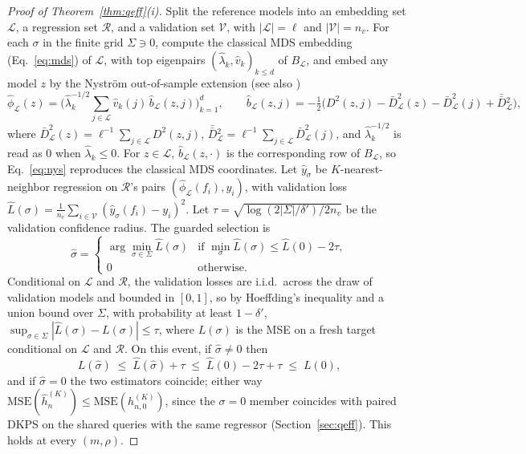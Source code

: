 \documentclass{article}
\theoremstyle{definition}
\theoremstyle{plain}
\begin{document}
\begin{proof}[Proof of Theorem~\ref{thm:qeff}(i)]
Split the reference models into an embedding set $\mathcal{L}$, a regression set $\mathcal{R}$, and a
validation set $\mathcal{V}$, with $|\mathcal{L}|=\ell$ and $|\mathcal{V}|=n_v$. For each $\sigma$ in the finite
grid $\Sigma\ni0$, compute the classical MDS embedding (Eq.~\eqref{eq:mds}) of $\mathcal{L}$,
with top eigenpairs $(\hat\lambda_k,\hat v_k)_{k\le d}$ of $B_{\mathcal{L}}$, and embed any model
$z$ by the Nystr\"om out-of-sample extension  (see also \citealp{trosset2008out})
\begin{equation}
\hat\phi_{\mathcal{L}}(z)=\Big(\hat\lambda_k^{-1/2}\sum_{j\in\mathcal{L}}\hat v_k(j)\,\hat b_{\mathcal{L}}(z,j)\Big)_{k=1}^{d},
\qquad
\hat b_{\mathcal{L}}(z,j)=-\tfrac12\Big(D^2(z,j)-\bar D^2_{\mathcal{L}}(z)-\bar D^2_{\mathcal{L}}(j)+\bar{\bar D}{}^2_{\mathcal{L}}\Big),
\label{eq:nys}
\end{equation}
where $\bar D^2_{\mathcal{L}}(z)=\ell^{-1}\sum_{j\in\mathcal{L}}D^2(z,j)$,
$\bar{\bar D}{}^2_{\mathcal{L}}=\ell^{-1}\sum_{j\in\mathcal{L}}\bar D^2_{\mathcal{L}}(j)$, and
$\hat\lambda_k^{-1/2}$ is read as $0$ when $\hat\lambda_k\le0$. For $z\in\mathcal{L}$,
$\hat b_{\mathcal{L}}(z,\cdot)$ is the corresponding row of $B_{\mathcal{L}}$, so Eq.~\eqref{eq:nys}
reproduces the classical MDS coordinates. Let $\hat y_{\sigma}$ be $K$-nearest-neighbor
regression on $\mathcal{R}$'s pairs $(\hat\phi_{\mathcal{L}}(f_i),y_i)$, with validation loss
$\hat L(\sigma)=\tfrac1{n_v}\sum_{i\in\mathcal{V}}(\hat y_{\sigma}(f_i)-y_i)^2$.
Let $\tau=\sqrt{\log(2|\Sigma|/\delta')/2n_v}$ be the validation confidence
radius. The guarded selection is
\[
\hat\sigma=\begin{cases}
\arg\min_{\sigma\in\Sigma}\hat L(\sigma) & \text{if }\min_{\sigma}\hat L(\sigma)\le\hat L(0)-2\tau,\\[2pt]
0 & \text{otherwise.}
\end{cases}
\]
Conditional on $\mathcal{L}$ and $\mathcal{R}$, the validation losses are i.i.d.\ across the draw of
validation models and bounded in $[0,1]$, so by Hoeffding's inequality  and a
union bound over $\Sigma$, with probability at least $1-\delta'$,
$\sup_{\sigma\in\Sigma}|\hat L(\sigma)-L(\sigma)|\le\tau$, where $L(\sigma)$ is
the MSE on a fresh target conditional on $\mathcal{L}$ and $\mathcal{R}$. On this event, if
$\hat\sigma\ne0$ then
\[
L(\hat\sigma)\;\le\;\hat L(\hat\sigma)+\tau\;\le\;\hat L(0)-2\tau+\tau\;\le\;L(0),
\]
and if $\hat\sigma=0$ the two estimators coincide; either way
$\mathrm{MSE}(\hat h_{n}^{(K)})\le\mathrm{MSE}(h_{n,0}^{(K)})$, since the
$\sigma=0$ member coincides with paired DKPS on the shared queries with the same
regressor (Section~\ref{sec:qeff}). This holds at every $(m,\rho)$.
\end{proof}
\end{document}
